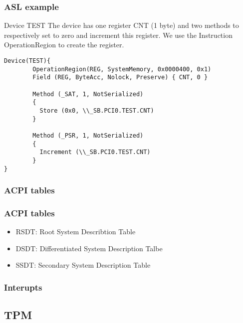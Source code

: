        \begin{frame}[fragile]
        \frametitle{ASL example}
        \begin{block}{Device TEST}
        The device has one register CNT (1 byte) and two methods to
        respectively set to zero and increment this register.
        We use the Instruction OperationRegion to create the register.
        \end{block}
\begin{verbatim}
Device(TEST){
        OperationRegion(REG, SystemMemory, 0x0000400, 0x1)
        Field (REG, ByteAcc, Nolock, Preserve) { CNT, 0 }

        Method (_SAT, 1, NotSerialized)
        {
          Store (0x0, \\_SB.PCI0.TEST.CNT)
        }

        Method (_PSR, 1, NotSerialized)
        {
          Increment (\\_SB.PCI0.TEST.CNT)
        }
}
\end{verbatim}
\end{frame}

\subsubsection{ACPI tables}
        \begin{frame}
                \frametitle{ACPI tables}
                \begin{itemize}
                        \item RSDT: Root System Describtion Table
                        \item DSDT: Differentiated System Description
                        Talbe
                        \item SSDT: Secondary System Description Table
                \end{itemize}
        \end{frame}
\subsubsection{Interupts}

\subsection{TPM}

